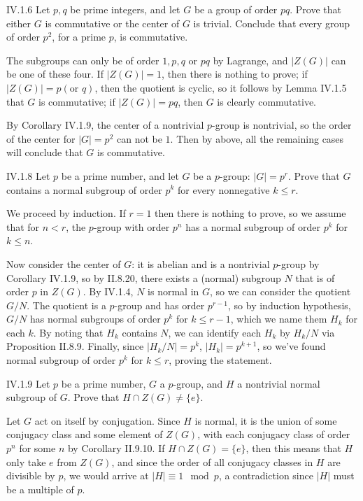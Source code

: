 \begin{problem}{IV.1.6}
Let $p,q$ be prime integers, and let $G$ be a group of order $pq$. Prove that either $G$ is commutative or the center of $G$ is trivial. Conclude that every group of order $p^2$, for a prime $p$, is commutative.
\end{problem}
\begin{pf}
The subgroups can only be of order $1,p,q$ or $pq$ by Lagrange, and $|Z(G)|$ can be one of these four. If $|Z(G)| = 1$, then there is nothing to prove; if $|Z(G)| = p (\text{or }q)$, then the quotient is cyclic, so it follows by Lemma IV.1.5 that $G$ is commutative; if $|Z(G)| = pq$, then $G$ is clearly commutative.

By Corollary IV.1.9, the center of a nontrivial $p$-group is nontrivial, so the order of the center for $|G| = p^2$ can not be $1$. Then by above, all the remaining cases will conclude that $G$ is commutative. 
\end{pf}

\begin{problem}{IV.1.8}
Let $p$ be a prime number, and let $G$ be a $p$-group: $|G| = p^r$. Prove that $G$ contains a normal subgroup of order $p^k$ for every nonnegative $k \leq r$.
\end{problem}
\begin{pf}
We proceed by induction. If $r = 1$ then there is nothing to prove, so we assume that for $n < r$, the $p$-group with order $p^n$ has a normal subgroup of order $p^k$ for $k \leq n$. 

Now consider the center of $G$: it is abelian and is a nontrivial $p$-group by Corollary IV.1.9, so by II.8.20, there exists a (normal) subgroup $N$ that is of order $p$ in $Z(G)$. By IV.1.4, $N$ is normal in $G$, so we can consider the quotient $G/N$. The quotient is a $p$-group and has order $p^{r-1}$, so by induction hypothesis, $G/N$ has normal subgroups of order $p^k$ for $k \leq r-1$, which we name them $H_k$ for each $k$. By noting that $H_k$ contains $N$, we can identify each $H_k$ by $H_k/N$ via Proposition II.8.9. Finally, since $|H_k/N| = p^k$, $|H_k| = p^{k+1}$, so we've found normal subgroup of order $p^k$ for $k \leq r$, proving the statement.
\end{pf}


\begin{problem}{IV.1.9}
Let $p$ be a prime number, $G$ a $p$-group, and $H$ a nontrivial normal subgroup of $G$. Prove that $H \cap Z(G) \neq \{e\}$. 
\end{problem}
\begin{pf}
Let $G$ act on itself by conjugation. Since $H$ is normal, it is the union of some conjugacy class and some element of $Z(G)$, with each conjugacy class of order $p^n$ for some $n$ by Corollary II.9.10. If $H \cap Z(G) = \{e\}$, then this means that $H$ only take $e$ from $Z(G)$, and since the order of all conjugacy classes in $H$ are divisible by $p$, we would arrive at $|H| \equiv 1 \mod p$, a contradiction since $|H|$ must be a multiple of $p$.
\end{pf}

